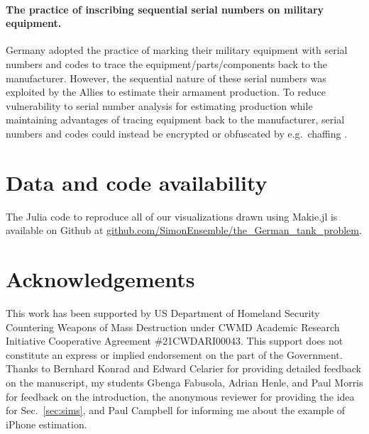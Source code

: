 \documentclass[11pt, oneside]{article}
\begin{document}
\paragraph{The practice of inscribing sequential serial numbers on military equipment.}
Germany adopted the practice of marking their military equipment with serial numbers and codes to trace the equipment/parts/components back to the manufacturer. However, the sequential nature of these serial numbers was exploited by the Allies to estimate their armament production. 
To reduce vulnerability to serial number analysis for estimating production while maintaining advantages of tracing equipment back to the manufacturer, serial numbers and codes could instead be encrypted \cite{delfs2002introduction} or obfuscated by e.g.\ chaffing \cite{rivest1998chaffing}. 

\section*{Data and code availability} The Julia \cite{bezanson2012julia} code to reproduce all of our visualizations drawn using Makie.jl \cite{DanischKrumbiegel2021} is available on Github at \url{github.com/SimonEnsemble/the_German_tank_problem}.

\section*{Acknowledgements}
This work has been supported by US Department of Homeland Security Countering Weapons of Mass Destruction under CWMD Academic Research Initiative Cooperative Agreement \#21CWDARI00043. This support does not constitute an express or implied endorsement on the part of the Government.
Thanks to Bernhard Konrad and Edward Celarier for providing detailed feedback on the manuscript, my students Gbenga Fabusola, Adrian Henle, and Paul Morris for feedback on the introduction, the anonymous reviewer for providing the idea for Sec.~\ref{sec:sims}, and Paul Campbell for informing me about the example of iPhone estimation.



\end{document}
